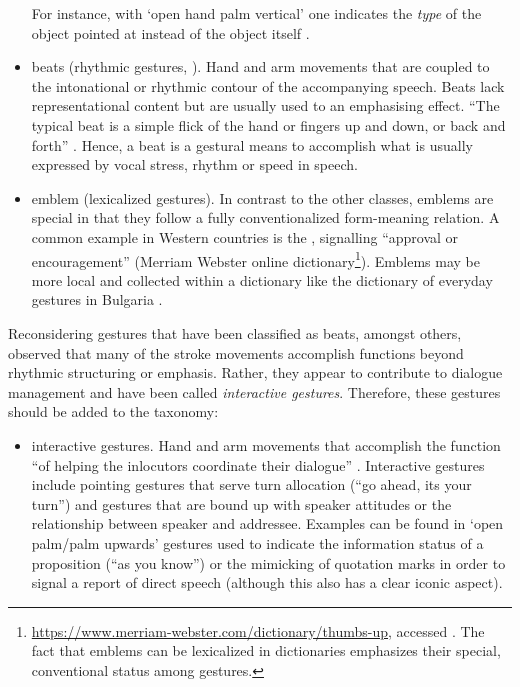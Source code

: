 \documentclass[output=paper]{langsci/langscibook}
\begin{document}
\begin{itemize}
%
For instance, with \enquote*{open hand palm vertical} one indicates the \emph{type} of the object pointed at instead of the object itself \citep[]{Kendon:Versante:2003}.
\item beats  (rhythmic gestures, ). Hand and arm movements that are coupled to the intonational or rhythmic contour of the accompanying speech. Beats lack representational content but are usually used to an emphasising effect. \enquote{The typical beat is a simple flick of the hand or fingers up and down, or back and forth} \citep[]{McNeill:1992}. Hence, a beat is a gestural means to accomplish what is usually expressed by vocal stress, rhythm or speed in speech. 
\item emblem   (lexicalized gestures). In contrast to the other classes, emblems are special in that they follow a fully conventionalized form-meaning relation. A common example in Western countries is the , signalling \enquote{approval or encouragement} (Merriam Webster online dictionary\footnote{\url{https://www.merriam-webster.com/dictionary/thumbs-up}, accessed . The fact that emblems can be lexicalized in dictionaries emphasizes their special, conventional status among gestures.}). Emblems may be more local and collected within a dictionary like the dictionary of everyday gestures in Bulgaria \citep{Kolarova:2011}.
\end{itemize}


Reconsidering gestures that have been classified as beats, amongst others, \citet{Bavelas:Chovil:Lawrie:Wade:1992} observed that many of the stroke movements accomplish functions beyond rhythmic structuring or emphasis.
%
Rather, they appear to contribute to dialogue management and have been called \emph{interactive gestures}.
%
Therefore, these gestures should be added to the taxonomy:

\begin{itemize}
\item interactive gestures.  Hand and arm movements that accomplish the function \enquote{of helping the inlocutors coordinate their dialogue} \citep[]{Bavelas:Chovil:Coates:Roe:1995}. Interactive gestures include pointing gestures that serve turn allocation (\enquote{go ahead, its your turn}) and gestures that are bound up with speaker attitudes or the relationship between speaker and addressee. Examples can be found in \enquote*{open palm/palm upwards} gestures used to indicate the information status of a proposition (\enquote{as you know}) or the mimicking of quotation marks in order to signal a report of direct speech (although this also has a clear iconic aspect).
\end{itemize}
\end{document}
